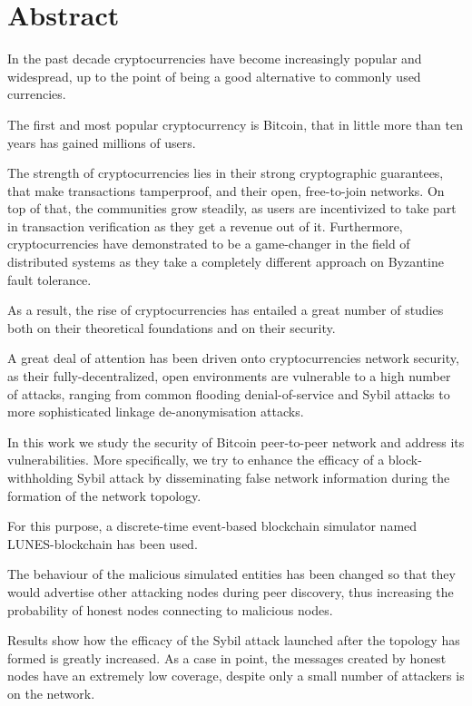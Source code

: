 \chapter*{Abstract} %
\label{sommario}

In the past decade cryptocurrencies have become increasingly popular and widespread, up to the point of being a good alternative to commonly used currencies.

The first and most popular cryptocurrency is Bitcoin, that in little more than ten years has gained millions of users.

The strength of cryptocurrencies lies in their strong cryptographic guarantees, that make transactions tamperproof, and their open, free-to-join networks. On top of that, the communities grow steadily, as users are incentivized to take part in transaction verification as they get a revenue out of it. Furthermore, cryptocurrencies have demonstrated to be a game-changer in the field of distributed systems as they take a completely different approach on Byzantine fault tolerance.

As a result, the rise of cryptocurrencies has entailed a great number of studies both on their theoretical foundations and on their security.

A great deal of attention has been driven onto cryptocurrencies network security, as their fully-decentralized, open environments are vulnerable to a high number of attacks, ranging from common flooding denial-of-service and Sybil attacks to more sophisticated linkage de-anonymisation attacks.

In this work we study the security of Bitcoin peer-to-peer network and address its vulnerabilities. More specifically, we try to enhance the efficacy of a block-withholding Sybil attack by disseminating false network information during the formation of the network topology. 

For this purpose, a discrete-time event-based blockchain simulator named LUNES-blockchain has been used.

The behaviour of the malicious simulated entities has been changed so that they would advertise other attacking nodes during peer discovery, thus increasing the probability of honest nodes connecting to malicious nodes.

Results show how the efficacy of the Sybil attack launched after the topology has formed is greatly increased. As a case in point, the messages created by honest nodes have an extremely low coverage, despite only a small number of attackers is on the network. 

